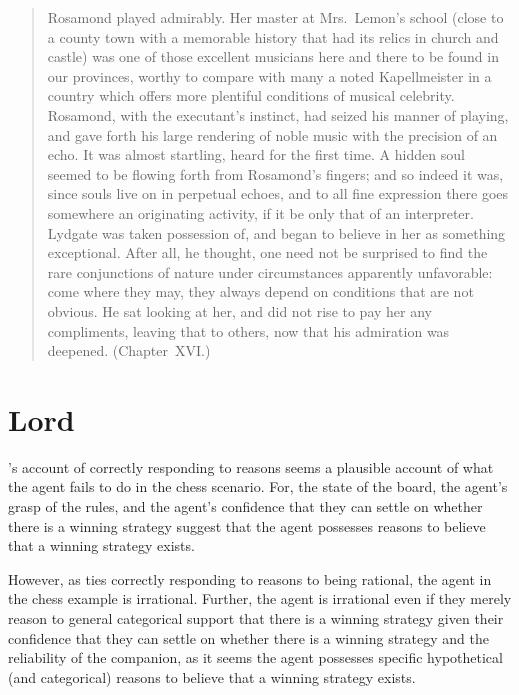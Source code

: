 \documentclass[10pt]{article}
\begin{document}
\begin{quote}
  Rosamond played admirably.
  Her master at Mrs.\ Lemon's school (close to a county town with a memorable history that had its relics in church and castle) was one of those excellent musicians here and there to be found in our provinces, worthy to compare with many a noted Kapellmeister in a country which offers more plentiful conditions of musical celebrity.
  Rosamond, with the executant's instinct, had seized his manner of playing, and gave forth his large rendering of noble music with the precision of an echo.
  It was almost startling, heard for the first time.
  A hidden soul seemed to be flowing forth from Rosamond's fingers; and so indeed it was, since souls live on in perpetual echoes, and to all fine expression there goes somewhere an originating activity, if it be only that of an interpreter.
  Lydgate was taken possession of, and began to believe in her as something exceptional.
  After all, he thought, one need not be surprised to find the rare conjunctions of nature under circumstances apparently
  unfavorable: come where they may, they always depend on conditions that are not obvious.
  He sat looking at her, and did not rise to pay her any compliments, leaving that to others, now that his admiration was deepened.\nolinebreak
  \mbox{}\hfill\mbox{(Chapter XVI.)}
\end{quote}

\newpage

\section{Lord}
\label{sec:lord}

\begin{note}
  \citeauthor{Lord:2018aa}'s account of correctly responding to reasons seems a plausible account of what the agent fails to do in the chess scenario.
  For, the state of the board, the agent's grasp of the rules, and the agent's confidence that they can settle on whether there is a winning strategy suggest that the agent possesses reasons to believe that a winning strategy exists.

  However, as \citeauthor{Lord:2018aa} ties correctly responding to reasons to being rational, the agent in the chess example is irrational.
  Further, the agent is irrational even if they merely reason to general categorical support that there is a winning strategy given their confidence that they can settle on whether there is a winning strategy and the reliability of the companion, as it seems the agent possesses specific hypothetical (and categorical) reasons to believe that a winning strategy exists.
\end{note}
\end{document}
